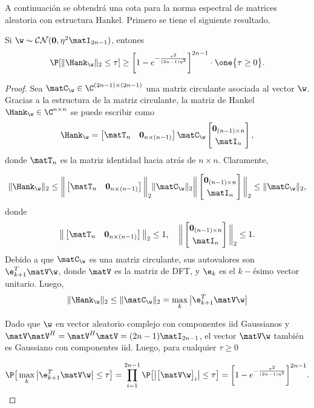 	A continuación se obtendrá una cota para la norma espectral de matrices aleatoria con estructura Hankel. Primero se tiene el siguiente resultado.
	\begin{lemma}\label{Lemma:2}
		Si $\w\sim\mathcal{CN}(\mathbf{0},\eta^2\matI_{2n-1})$, entones 
		\begin{equation}
			\P[\|\Hank_{\w}\|_2 \leq \tau]\geq\bigg[1-e^{-\frac{\tau^2}{(2n-1)\eta^2}}\bigg]^{2n-1} \cdot\one\big\{\tau\geq 0\big\}.
			\label{Eq:BoundCirculantMatrix2}
		\end{equation}		 
	\end{lemma}
	\begin{proof}  Sea $\matC_{\w}\in\C^{(2n-1)\times(2n-1)}$ una matriz circulante asociada al vector $\w$. Gracias a la estructura de la matriz circulante, la matriz de Hankel $\Hank_{\w}\in\C^{n\times n}$ se puede escribir como
		\[\Hank_{\w} = \begin{bmatrix}\matT_n & \mathbf{0}_{n\times(n-1)}\end{bmatrix}\matC_{\w}\begin{bmatrix}\mathbf{0}_{(n-1)\times n}\\[0.3em] \matI_n
		\end{bmatrix},\]
		donde $\matT_n$ es la matriz identidad hacia atrás de $n\times n$. Claramente,
		
		\[\|\Hank_{\w}\|_2\le \bigg\|\begin{bmatrix}\matT_n & \mathbf{0}_{n\times(n-1)}\end{bmatrix}\bigg\|_2\|\matC_{\w}\|_2\bigg\|\begin{bmatrix}\mathbf{0}_{(n-1)\times n}\\[0.3em] \matI_n
		\end{bmatrix}\bigg\|_2 \le \|\matC_{\w}\|_2,\]
		donde 
		\[\big\|\begin{bmatrix}\matT_n & \mathbf{0}_{n\times(n-1)}\end{bmatrix}\big\|_2\le 1,\quad \bigg\|\begin{bmatrix}\mathbf{0}_{(n-1)\times n}\\[0.3em] \matI_n
		\end{bmatrix}\bigg\|_2\le 1.\]
		Debido a que $\matC_{\w}$ es una matriz circulante, sus autovalores son $\e^T_{k+1}\matV\w$, donde $\matV$ es la matriz de DFT, y $\e_k$ es el $k-$ésimo vector unitario. Luego,
		\[\|\Hank_{\w}\|_2\le\|\matC_{\w}\|_2 = \max_k \big|\e^T_{k+1}\matV\w\big|\]
		
		Dado que $\w$ en vector aleatorio complejo con componentes iid Gaussianos y $\matV\matV^H = \matV^H\matV = (2n-1)\matI_{2n-1}$, el vector $\matV\w$ también es Gaussiano con componentes iid. Luego, para cualquier $\tau\ge0$
		
		\[\P\big[\max_k\big|\e_{k+1}^T\matV\w\big|\le \tau\big] = \prod_{i=1}^{2n-1}\P\big[\big|\big[\matV\w\big]_i\big|\le \tau\big] = \bigg[1-e^{-\frac{\tau^2}{(2n-1)\eta^2}}\bigg]^{2n-1}.\]\end{proof}
	
